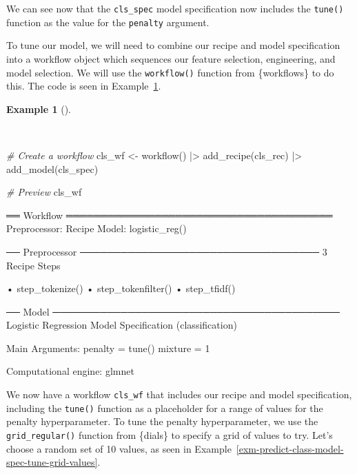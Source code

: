 \documentclass[
  letterpaper,
]{book}
\newenvironment{Shaded}{\begin{snugshade}}{\end{snugshade}}
\newcommand{\CommentTok}[1]{\textcolor[rgb]{0.00,0.00,0.00}{\textit{#1}}}
\newcommand{\FunctionTok}[1]{\textcolor[rgb]{0.00,0.00,0.00}{#1}}
\newcommand{\NormalTok}[1]{\textcolor[rgb]{0.00,0.00,0.00}{#1}}
\newcommand{\OtherTok}[1]{\textcolor[rgb]{0.00,0.00,0.00}{#1}}
\newcommand{\SpecialCharTok}[1]{\textcolor[rgb]{0.00,0.00,0.00}{#1}}
\theoremstyle{definition}
\newtheorem{example}{Example}[chapter]
\theoremstyle{remark}
\begin{document}
We can see now that the \texttt{cls\_spec} model specification now
includes the \texttt{tune()} function as the value for the
\texttt{penalty} argument.

To tune our model, we will need to combine our recipe and model
specification into a workflow object which sequences our feature
selection, engineering, and model selection. We will use the
\texttt{workflow()} function from \{workflows\} to do this. The code is
seen in Example~\ref{exm-predict-class-workflow}.

\begin{example}[]\protect\hypertarget{exm-predict-class-workflow}{}\label{exm-predict-class-workflow}

~

\begin{Shaded}
\begin{Highlighting}[]
\CommentTok{\# Create a workflow}
\NormalTok{cls\_wf }\OtherTok{\textless{}{-}}
  \FunctionTok{workflow}\NormalTok{() }\SpecialCharTok{|\textgreater{}}
  \FunctionTok{add\_recipe}\NormalTok{(cls\_rec) }\SpecialCharTok{|\textgreater{}}
  \FunctionTok{add\_model}\NormalTok{(cls\_spec)}

\CommentTok{\# Preview}
\NormalTok{cls\_wf}
\end{Highlighting}
\end{Shaded}

\begin{Shaded}
\begin{Highlighting}[]
\NormalTok{══ Workflow ═══════════════════════════════════════}
\NormalTok{Preprocessor: Recipe}
\NormalTok{Model: logistic\_reg()}

\NormalTok{── Preprocessor ───────────────────────────────────}
\NormalTok{3 Recipe Steps}

\NormalTok{• step\_tokenize()}
\NormalTok{• step\_tokenfilter()}
\NormalTok{• step\_tfidf()}

\NormalTok{── Model ──────────────────────────────────────────}
\NormalTok{Logistic Regression Model Specification (classification)}

\NormalTok{Main Arguments:}
\NormalTok{  penalty = tune()}
\NormalTok{  mixture = 1}

\NormalTok{Computational engine: glmnet}
\end{Highlighting}
\end{Shaded}

\end{example}

We now have a workflow \texttt{cls\_wf} that includes our recipe and
model specification, including the \texttt{tune()} function as a
placeholder for a range of values for the penalty hyperparameter. To
tune the penalty hyperparameter, we use the \texttt{grid\_regular()}
function from \{dials\} to specify a grid of values to try. Let's choose
a random set of 10 values, as seen in
Example~\ref{exm-predict-class-model-spec-tune-grid-values}.
\end{document}
